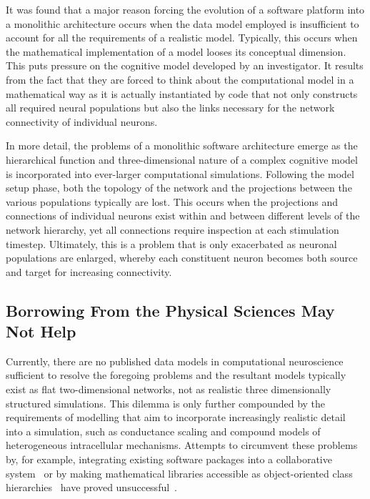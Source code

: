 \documentclass[11pt,3p,twocolumn]{JMN}
\begin{document}
It was found that a major reason forcing the evolution of a software platform into a monolithic architecture occurs when the data model employed is insufficient to account for all the requirements of a realistic model. Typically, this occurs when the mathematical implementation of a model looses its conceptual dimension. This puts pressure on the cognitive model developed by an investigator. It results from the fact that they are forced to think about the computational model in a mathematical way as it is actually instantiated by code that not only constructs all required neural populations but also the links necessary for the network connectivity of individual neurons.

In more detail, the problems of a monolithic software architecture emerge as the hierarchical function and three-dimensional nature of a complex cognitive model is incorporated into ever-larger computational simulations. Following the model setup phase, both the topology of the network and the projections between the various populations typically are lost. This occurs when the projections and connections of individual neurons exist within and between different levels of the network hierarchy, yet all connections require inspection at each stimulation timestep. Ultimately, this is a problem that is only exacerbated as neuronal populations are enlarged, whereby each constituent neuron becomes both source and target for increasing connectivity.

\subsection{Borrowing From the Physical Sciences May Not Help}

Currently, there are no published data models in computational neuroscience sufficient to resolve the foregoing problems and the resultant models typically exist as flat two-dimensional networks, not as realistic three dimensionally structured simulations. This dilemma is only further compounded by the requirements of modelling that aim to incorporate increasingly realistic detail into a simulation, such as conductance scaling and compound models of heterogeneous intracellular mechanisms. Attempts to circumvent these problems by, for example, integrating existing software packages into a collaborative system~\citep{goddard01:_neosim} or by making mathematical libraries accessible as object-oriented class hierarchies~\citep{vibert01} have proved unsuccessful~\citep{cornelis03}.
\end{document}
